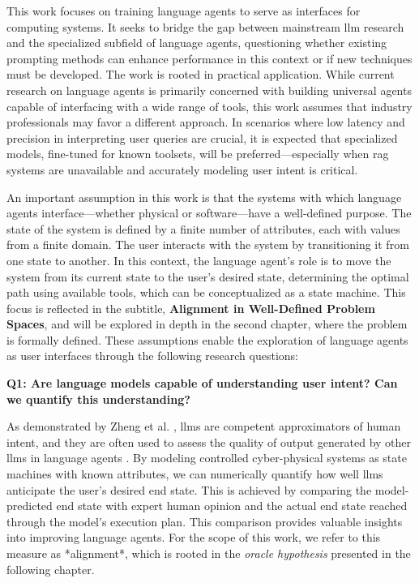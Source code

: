 \pskip

This work focuses on training language agents to serve as interfaces for computing systems. It seeks to bridge the gap between mainstream \gls{llm} research and the specialized subfield of language agents, questioning whether existing prompting methods can enhance performance in this context or if new techniques must be developed. The work is rooted in practical application. While current research on language agents is primarily concerned with building universal agents capable of interfacing with a wide range of tools, this work assumes that industry professionals may favor a different approach. In scenarios where low latency and precision in interpreting user queries are crucial, it is expected that specialized models, fine-tuned for known toolsets, will be preferred—especially when \gls{rag} systems are unavailable and accurately modeling user intent is critical.

\pskip

An important assumption in this work is that the systems with which language agents interface—whether physical or software—have a well-defined purpose. The state of the system is defined by a finite number of attributes, each with values from a finite domain. The user interacts with the system by transitioning it from one state to another. In this context, the language agent's role is to move the system from its current state to the user's desired state, determining the optimal path using available tools, which can be conceptualized as a state machine. This focus is reflected in the subtitle, \textbf{Alignment in Well-Defined Problem Spaces}, and will be explored in depth in the second chapter, where the problem is formally defined. These assumptions enable the exploration of language agents as user interfaces through the following research questions:

\pskip

\textbf{Q1: Are language models capable of understanding user intent? Can we quantify this understanding?}

\vskip 0.1in

As demonstrated by Zheng et al. \cite{zheng2023judgingllmasajudgemtbenchchatbot}, \glspl{llm} are competent approximators of human intent, and they are often used to assess the quality of output generated by other \glspl{llm} in language agents \cite{qin2023toolllmfacilitatinglargelanguage}. By modeling controlled cyber-physical systems as state machines with known attributes, we can numerically quantify how well \glspl{llm} anticipate the user's desired end state. This is achieved by comparing the model-predicted end state with expert human opinion and the actual end state reached through the model's execution plan. This comparison provides valuable insights into improving language agents. For the scope of this work, we refer to this measure as *alignment*, which is rooted in the \textit{oracle hypothesis} presented in the following chapter.

